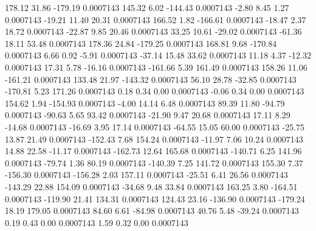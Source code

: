       178.12       31.86     -179.19     0.0007143
      145.32        6.02     -144.43     0.0007143
       -2.80        8.45        1.27     0.0007143
      -19.21       11.40       20.31     0.0007143
      166.52        1.82     -166.61     0.0007143
      -18.47        2.37       18.72     0.0007143
      -22.87        9.85       20.46     0.0007143
       33.25       10.61      -29.02     0.0007143
      -61.36       18.11       53.48     0.0007143
      178.36       24.84     -179.25     0.0007143
      168.81        9.68     -170.84     0.0007143
        6.66        0.92       -5.91     0.0007143
      -37.14       15.48       33.62     0.0007143
       11.18        4.37      -12.32     0.0007143
       17.31        5.78      -16.16     0.0007143
     -161.66        5.39      161.49     0.0007143
      158.26       11.06     -161.21     0.0007143
      133.48       21.97     -143.32     0.0007143
       56.10       28.78      -32.85     0.0007143
     -170.81        5.23      171.26     0.0007143
        0.18        0.34        0.00     0.0007143
       -0.06        0.34        0.00     0.0007143
      154.62        1.94     -154.93     0.0007143
       -4.00       14.14        6.48     0.0007143
       89.39       11.80      -94.79     0.0007143
      -90.63        5.65       93.42     0.0007143
      -21.90        9.47       20.68     0.0007143
       17.11        8.29      -14.68     0.0007143
      -16.69        3.95       17.14     0.0007143
      -64.55       15.05       60.00     0.0007143
      -25.75       13.87       21.49     0.0007143
     -152.43        7.68      154.24     0.0007143
      -11.97        7.06       10.24     0.0007143
       14.88       22.58      -11.17     0.0007143
     -162.73       12.64      165.68     0.0007143
     -140.71        6.25      141.96     0.0007143
      -79.74        1.36       80.19     0.0007143
     -140.39        7.25      141.72     0.0007143
      155.30        7.37     -156.30     0.0007143
     -156.28        2.03      157.11     0.0007143
      -25.51        6.41       26.56     0.0007143
     -143.29       22.88      154.09     0.0007143
      -34.68        9.48       33.84     0.0007143
      163.25        3.80     -164.51     0.0007143
     -119.90       21.41      134.31     0.0007143
      124.43       23.16     -136.90     0.0007143
     -179.24       18.19      179.05     0.0007143
       84.60        6.61      -84.98     0.0007143
       40.76        5.48      -39.24     0.0007143
        0.19        0.43        0.00     0.0007143
        1.59        0.32        0.00     0.0007143

